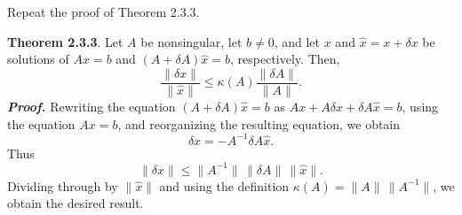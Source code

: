 \documentclass{report}
\begin{document}
    \bigbreak \noindent 
    \begin{mdframed}
        Repeat the proof of Theorem 2.3.3.
    \end{mdframed}
    \bigbreak \noindent 
    \begin{remark}
        \textbf{Theorem 2.3.3}. 
        Let $A$ be nonsingular, let $b \neq 0$, and let $x$ and $\hat{x} = x + \delta x$ be 
        solutions of $Ax = b$ and $(A + \delta A)\hat{x} = b$, respectively. Then,
        \[
            \frac{\|\delta x\|}{\|\hat{x}\|} 
            \leq \kappa(A) \frac{\|\delta A\|}{\|A\|}.
            \tag{2.3.4}
        \]
        \textbf{\textit{Proof.}} Rewriting the equation $(A + \delta A)\hat{x} = b$ as 
        $Ax + A\delta x + \delta A\hat{x} = b$, using the equation $Ax = b$, and reorganizing 
        the resulting equation, we obtain
        \[
            \delta x = -A^{-1} \delta A \hat{x}.
        \]
        Thus
        \[
            \|\delta x\| \leq \|A^{-1}\| \, \|\delta A\| \, \|\hat{x}\|.
            \tag{2.3.5}
        \]
        Dividing through by $\|\hat{x}\|$ and using the definition 
        $\kappa(A) = \|A\| \, \|A^{-1}\|$, we obtain the desired result.
    \end{remark}
    
\end{document}
